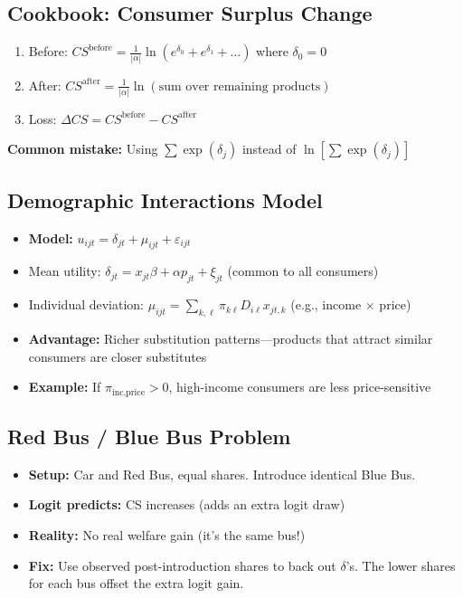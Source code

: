 \documentclass[11pt]{article}
\begin{document}
\subsection{Cookbook: Consumer Surplus Change}
\begin{enumerate}
	\item Before: $CS^{\text{before}} = \frac{1}{|\alpha|} \ln(e^{\delta_0} + e^{\delta_1} + \ldots)$ where $\delta_0 = 0$
	\item After: $CS^{\text{after}} = \frac{1}{|\alpha|} \ln(\text{sum over remaining products})$
	\item Loss: $\Delta CS = CS^{\text{before}} - CS^{\text{after}}$
\end{enumerate}
\textbf{Common mistake:} Using $\sum \exp(\delta_j)$ instead of $\ln[\sum \exp(\delta_j)]$

\subsection{Demographic Interactions Model}
\begin{itemize}
	\item \textbf{Model:} $u_{ijt} = \delta_{jt} + \mu_{ijt} + \varepsilon_{ijt}$
	\item Mean utility: $\delta_{jt} = x_{jt}\beta + \alpha p_{jt} + \xi_{jt}$ (common to all consumers)
	\item Individual deviation: $\mu_{ijt} = \sum_{k,\ell} \pi_{k\ell} D_{i\ell} x_{jt,k}$ (e.g., income $\times$ price)
	\item \textbf{Advantage:} Richer substitution patterns---products that attract similar consumers are closer substitutes
	\item \textbf{Example:} If $\pi_{\text{inc,price}} > 0$, high-income consumers are less price-sensitive
\end{itemize}

\subsection{Red Bus / Blue Bus Problem}
\begin{itemize}
	\item \textbf{Setup:} Car and Red Bus, equal shares. Introduce identical Blue Bus.
	\item \textbf{Logit predicts:} CS increases (adds an extra logit draw)
	\item \textbf{Reality:} No real welfare gain (it's the same bus!)
	\item \textbf{Fix:} Use observed post-introduction shares to back out $\delta$'s. The lower shares for each bus offset the extra logit gain.
\end{itemize}
\end{document}
